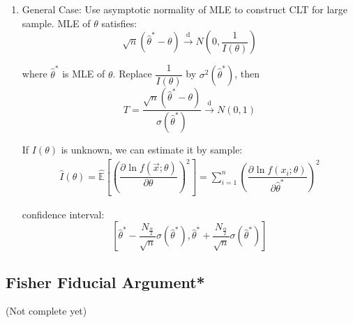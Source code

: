 \begin{enumerate}

    
    \item General Case: Use asymptotic normality of MLE to construct CLT for large sample. MLE of $\theta$ satisfies:
    \begin{equation}
        \sqrt{n}(\hat{\theta}^*-\theta)\xrightarrow[]{\mathrm{d}}N(0,\frac{1}{I(\theta )})
    \end{equation}

    where $\hat{\theta}^*$ is MLE of $\theta$. Replace $\dfrac{1}{I(\theta)}$ by $\sigma^2(\hat{\theta}^*)$, then
    \begin{equation}
        T=\frac{\sqrt{n}(\hat{\theta}^*-\theta)}{\sigma(\hat{\theta}^*)}\xrightarrow[]{\mathrm{d}}N(0,1)    
    \end{equation}

    If $ I(\theta ) $ is unknown, we can estimate it by sample:
    \begin{align}
        \hat{I}(\theta )=\hat{\mathbb{E}}\left[\left(\dfrac{\partial^{} \ln f(\vec{x};\theta )}{\partial \theta ^{}}\right)^2\right]=\sum_{i=1}^n \left(\dfrac{\partial^{} \ln f(x_i;\theta )}{\partial \hat{\theta}^*}\right)^2
    \end{align}

    confidence interval:
    \begin{equation}
        \left[\hat{\theta}^*-\frac{N_{\frac{\alpha}{2}}}{\sqrt{n}}\sigma(\hat{\theta}^*),\hat{\theta}^*+\frac{N_{\frac{\alpha}{2}}}{\sqrt{n}}\sigma(\hat{\theta}^*)\right]
    \end{equation}
    \end{enumerate}


\subsection{Fisher Fiducial Argument*}\label{SubSectionFisherFiducialArgument}
    (Not complete yet)

